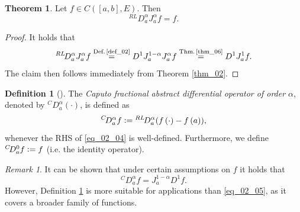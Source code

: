 \documentclass[reqno]{amsart}
\numberwithin{equation}{section}
\theoremstyle{definition}
\newtheorem{definition}{Definition}
\newtheorem{theorem}{Theorem}
\theoremstyle{remark}
\newtheorem{remark}{Remark}
\newcommand{\br}[1]{\left(#1\right)}
\newcommand{\C}[2]{C\br{#1,#2}}
\newcommand{\D}[1]{D^1#1}
\newcommand{\DC}[3]{{}^{C}\!D^{#1}_{#2}{#3}}
\newcommand{\defRef}[1]{\textrm{Def.\,\ref{#1}}}
\newcommand{\definitionRef}[1]{\textrm{Definition \ref{#1}}}
\newcommand{\defeq}{\vcentcolon=}
\newcommand{\DRL}[3]{{}^{RL}\!D^{#1}_{#2}{#3}}
\newcommand{\eqText}[1]{\stackrel{#1}{=}}
\newcommand{\JRL}[3]{J^{#1}_{#2}{#3}}
\newcommand{\sbr}[1]{\left[#1\right]}
\newcommand{\theoremRef}[1]{\textrm{Theorem \ref{#1}}}
\newcommand{\thmRef}[1]{\textrm{Thm.\,\ref{#1}}}
\begin{document}
	\begin{theorem}\label{thm_08}
		Let $f\in\C{\sbr{a,b}}{E}$. Then
		\begin{equation*}
			\DRL{\alpha}{a}{\JRL{\alpha}{a}{f}}=f.
		\end{equation*}
	\end{theorem}
	\begin{proof}
	It holds that
	\begin{equation*}
		\DRL{\alpha}{a}{\JRL{\alpha}{a}{f}}\eqText{\defRef{def_02}}\D{\JRL{1-\alpha}{a}{\JRL{\alpha}{a}{f}}}\eqText{\thmRef{thm_06}}\D{\JRL{1}{a}{f}}.
	\end{equation*}
	The claim then follows immediately from \theoremRef{thm_02}.
	\end{proof}

	\begin{definition}[]\label{def_03}
		The \textit{Caputo fractional abstract differential operator of order $\alpha$}, denoted by $\DC{\alpha}{a}{\br{\cdot}}$, is defined as
		\begin{equation}\label{eq_02_04}
			\DC{\alpha}{a}{f}\defeq\DRL{\alpha}{a}{\br{f\br{\cdot}-f\br{a}}},
		\end{equation}
		whenever the RHS of \eqref{eq_02_04} is well-defined. Furthermore, we define $\DC{0}{a}{f}\defeq{f}$ (i.e. the identity operator).
	\end{definition}
	\begin{remark}
		It can be shown that under certain assumptions on $f$ it holds that
		\begin{equation}\label{eq_02_05}
			\DC{\alpha}{a}{f}=\JRL{1-\alpha}{a}{\D{f}}.
		\end{equation}
		However, \definitionRef{def_03} is more suitable for applications than \eqref{eq_02_05}, as it covers a broader family of functions.
	\end{remark}
	
\end{document}
